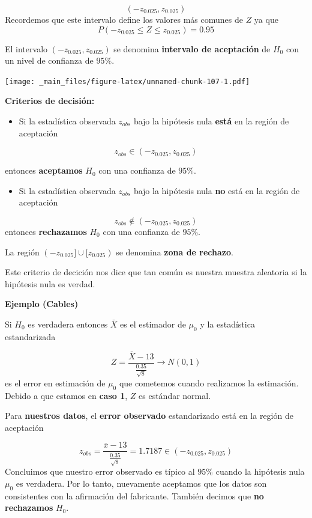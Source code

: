 \documentclass[
]{book}
\providecommand{\tightlist}{%
  \setlength{\itemsep}{0pt}\setlength{\parskip}{0pt}}
\begin{document}
\[(-z_{0.025}, z_{0.025})\]
Recordemos que este intervalo define los valores más comunes de \(Z\) ya que \[P(-z_{0.025} \leq Z \leq z_{0.025})=0.95\]

El intervalo \((-z_{0.025}, z_{0.025})\) se denomina \textbf{intervalo de aceptación} de \(H_0\) con un nivel de confianza de \(95\%\).

\texttt{[image: \_main\_files/figure-latex/unnamed-chunk-107-1.pdf]}

\textbf{Criterios de decisión:}

\begin{itemize}
\tightlist
\item
  Si la estadística observada \(z_{obs}\) bajo la hipótesis nula \textbf{está} en la región de aceptación
\end{itemize}

\[z_{obs} \in (-z_{0.025}, z_{0.025})\]

entonces \textbf{aceptamos} \(H_0\) con una confianza de \(95\%\).

\begin{itemize}
\tightlist
\item
  Si la estadística observada \(z_{obs}\) bajo la hipótesis nula \textbf{no} está en la región de aceptación
\end{itemize}

\[z_{obs} \notin (-z_{0.025}, z_{0.025})\] entonces \textbf{rechazamos} \(H_0\) con una confianza de \(95\%\).

La región \((-z_{0.025}] \cup[z_{0.025})\) se denomina \textbf{zona de rechazo}.

Este criterio de decición nos dice que tan común es nuestra muestra aleatoria si la hipótesis nula es verdad.

\textbf{Ejemplo (Cables)}

Si \(H_0\) es verdadera entonces \(\bar{X}\) es el estimador de \(\mu_0\) y la estadística estandarizada

\[Z=\frac{\bar{X}-13}{\frac{0.35}{\sqrt{8}}} \rightarrow N(0,1)\]
es el error en estimación de \(\mu_0\) que cometemos cuando realizamos la estimación. Debido a que estamos en \textbf{caso 1}, \(Z\) es estándar normal.

Para \textbf{nuestros datos}, el \textbf{error observado} estandarizado está en la región de aceptación

\[z_{obs}=\frac{\bar{x}-13}{\frac{0.35}{\sqrt{8}}}=1.7187 \in (-z_{0.025}, z_{0.025})\]
Concluimos que nuestro error observado es típico al \(95\%\) cuando la hipótesis nula \(\mu_0\) es verdadera. Por lo tanto, nuevamente aceptamos que los datos son consistentes con la afirmación del fabricante. También decimos que \textbf{no rechazamos} \(H_0\).
\end{document}
